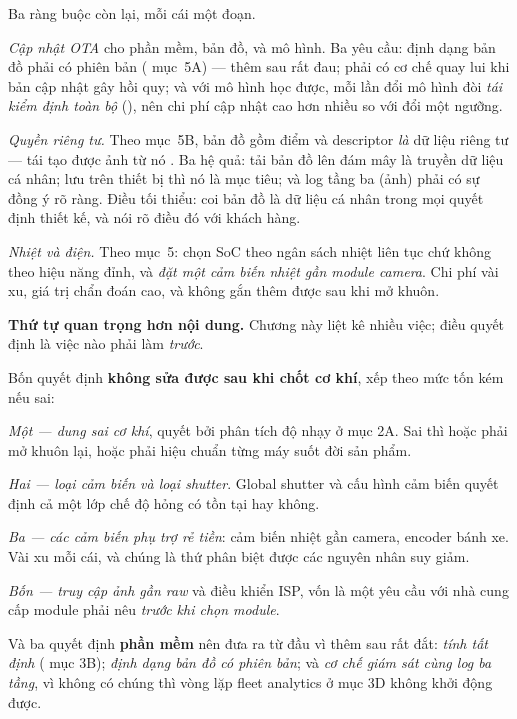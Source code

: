 \documentclass[../../vslam.tex]{subfiles}
\begin{document}
Ba ràng buộc còn lại, mỗi cái một đoạn.

\emph{Cập nhật OTA} cho phần mềm, bản đồ, và mô hình. Ba yêu cầu: định dạng bản đồ phải có phiên bản ( mục~5A) --- thêm sau rất đau; phải có cơ chế quay lui khi bản cập nhật gây hồi quy; và với mô hình học được, mỗi lần đổi mô hình đòi \emph{tái kiểm định toàn bộ} (), nên chi phí cập nhật cao hơn nhiều so với đổi một ngưỡng.

\emph{Quyền riêng tư.} Theo  mục~5B, bản đồ gồm điểm và descriptor \emph{là} dữ liệu riêng tư --- tái tạo được ảnh từ nó \cite{pittaluga2019revealing}. Ba hệ quả: tải bản đồ lên đám mây là truyền dữ liệu cá nhân; lưu trên thiết bị thì nó là mục tiêu; và log tầng ba (ảnh) phải có sự đồng ý rõ ràng. Điều tối thiểu: coi bản đồ là dữ liệu cá nhân trong mọi quyết định thiết kế, và nói rõ điều đó với khách hàng.

\emph{Nhiệt và điện.} Theo  mục~5: chọn SoC theo ngân sách nhiệt liên tục chứ không theo hiệu năng đỉnh, và \emph{đặt một cảm biến nhiệt gần module camera}. Chi phí vài xu, giá trị chẩn đoán cao, và không gắn thêm được sau khi mở khuôn.

\begin{cannho}
\textbf{Thứ tự quan trọng hơn nội dung.} Chương này liệt kê nhiều việc; điều quyết định là việc nào phải làm \emph{trước}.

Bốn quyết định \textbf{không sửa được sau khi chốt cơ khí}, xếp theo mức tốn kém nếu sai:

\emph{Một --- dung sai cơ khí}, quyết bởi phân tích độ nhạy ở mục 2A. Sai thì hoặc phải mở khuôn lại, hoặc phải hiệu chuẩn từng máy suốt đời sản phẩm.

\emph{Hai --- loại cảm biến và loại shutter}. Global shutter và cấu hình cảm biến quyết định cả một lớp chế độ hỏng có tồn tại hay không.

\emph{Ba --- các cảm biến phụ trợ rẻ tiền}: cảm biến nhiệt gần camera, encoder bánh xe. Vài xu mỗi cái, và chúng là thứ phân biệt được các nguyên nhân suy giảm.

\emph{Bốn --- truy cập ảnh gần raw} và điều khiển ISP, vốn là một yêu cầu với nhà cung cấp module phải nêu \emph{trước khi chọn module}.

Và ba quyết định \textbf{phần mềm} nên đưa ra từ đầu vì thêm sau rất đắt: \emph{tính tất định} ( mục 3B); \emph{định dạng bản đồ có phiên bản}; và \emph{cơ chế giám sát cùng log ba tầng}, vì không có chúng thì vòng lặp fleet analytics ở mục 3D không khởi động được.
\end{cannho}
\end{document}
